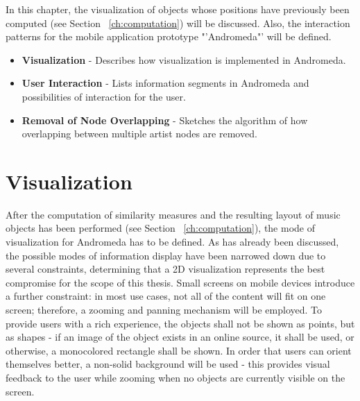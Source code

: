 In this chapter, the visualization of objects whose positions have previously been computed (see Section ~\ref{ch:computation}) will be discussed. Also, the interaction patterns for the mobile application prototype "'Andromeda"' will be defined.

\begin{itemize}
	\item \textbf {Visualization} - Describes how visualization is implemented in Andromeda.
	\item \textbf {User Interaction} - Lists information segments in Andromeda and possibilities of interaction for the user.
	\item \textbf {Removal of Node Overlapping} - Sketches the algorithm of how overlapping between multiple artist nodes are removed.
\end{itemize}

\section{Visualization}

After the computation of similarity measures and the resulting layout of music objects has been performed (see Section ~\ref{ch:computation}), the mode of visualization for Andromeda has to be defined. As has already been discussed, the possible modes of information display have been narrowed down due to several constraints, determining that a 2D visualization represents the best compromise for the scope of this thesis. Small screens on mobile devices introduce a further constraint: in most use cases, not all of the content will fit on one screen; therefore, a zooming and panning mechanism will be employed. To provide users with a rich experience, the objects shall not be shown as points, but as shapes - if an image of the object exists in an online source, it shall be used, or otherwise, a monocolored rectangle shall be shown. In order that users can orient themselves better, a non-solid background will be used - this provides visual feedback to the user while zooming when no objects are currently visible on the screen.

